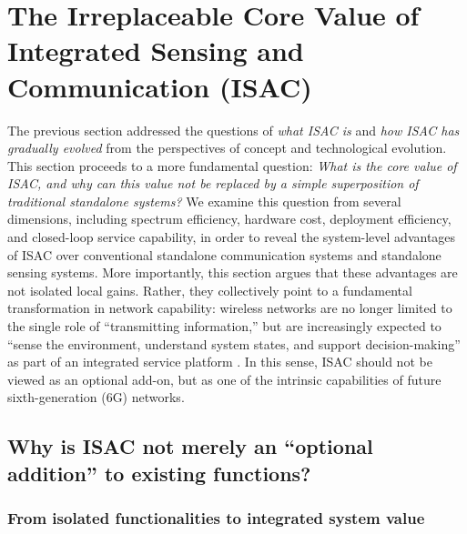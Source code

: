
\section{The Irreplaceable Core Value of Integrated Sensing and Communication (ISAC)}
\label{sec:ch1-isac-core-value}


The previous section addressed the questions of \emph{what ISAC is} and \emph{how ISAC has gradually evolved} from the perspectives of concept and technological evolution. This section proceeds to a more fundamental question: \emph{What is the core value of ISAC, and why can this value not be replaced by a simple superposition of traditional standalone systems?} We examine this question from several dimensions, including spectrum efficiency, hardware cost, deployment efficiency, and closed-loop service capability, in order to reveal the system-level advantages of ISAC over conventional standalone communication systems and standalone sensing systems. More importantly, this section argues that these advantages are not isolated local gains. Rather, they collectively point to a fundamental transformation in network capability: wireless networks are no longer limited to the single role of ``transmitting information,'' but are increasingly expected to ``sense the environment, understand system states, and support decision-making'' as part of an integrated service platform \cite{Liu2022ISAC,Gonzalez2024integrated,Saad2020Vision6G}. In this sense, ISAC should not be viewed as an optional add-on, but as one of the intrinsic capabilities of future sixth-generation (6G) networks.

\subsection{Why is ISAC not merely an ``optional addition'' to existing functions?}
\label{subsec:ch1-isac-core-value-why}
\subsubsection{From isolated functionalities to integrated system value}
\label{subsubsec:ch1-isac-core-value-logic}

